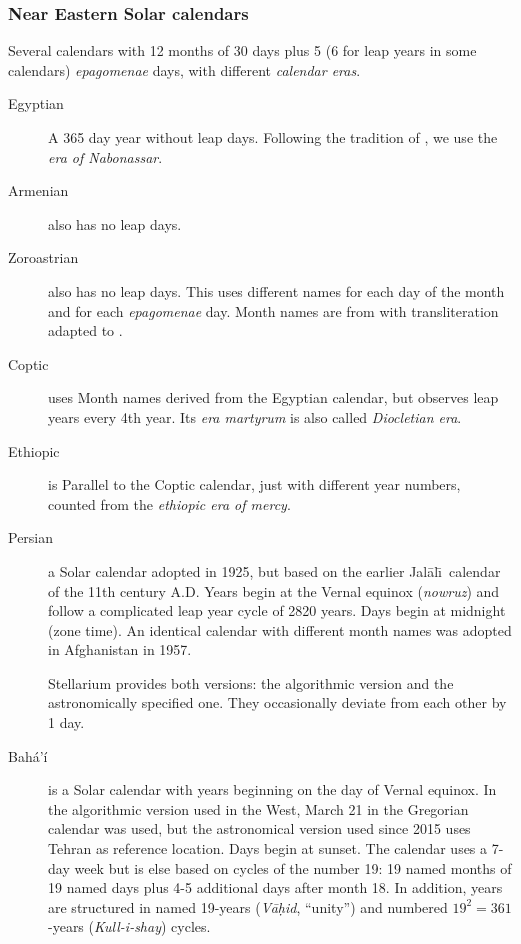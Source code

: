 \subsubsection{Near Eastern Solar calendars}
Several calendars with 12 months of 30 days plus 5 (6 for leap years
in some calendars) \emph{epagomenae} days, with different \emph{calendar eras}.
\begin{description}
\item[Egyptian] A 365 day year without leap days. Following the
  tradition of , we use the \emph{era of Nabonassar}.
\item[Armenian] also has no leap days.
\item[Zoroastrian] also has no leap days. This uses different names
  for each day of the month and for each \emph{epagomenae} day. Month
  names are from \citet[\S69]{Ginzel:ChronologieI} with
  transliteration adapted to \citet{Reingold-Dershowitz:2018}.
\item[Coptic] uses Month names derived from the Egyptian calendar, but observes
  leap years every 4th year. Its \emph{era martyrum} is also called
  \emph{Diocletian era}.
\item[Ethiopic] is Parallel to the Coptic calendar, just with different
  year numbers, counted from the \emph{ethiopic era of mercy}.
\item[Persian] a Solar calendar adopted in 1925,
  but based on the earlier Jal\=al\=\i\ calendar of the 11th century
  A.D. Years begin at the Vernal equinox (\emph{nowruz}) and follow a
  complicated leap year cycle of 2820 years. Days begin at midnight
  (zone time). An identical calendar with different month names was
  adopted in Afghanistan in 1957.

  Stellarium provides both versions: the algorithmic version and the
  astronomically specified one. They occasionally deviate from each
  other by 1 day.
\item[Bahá’í] is a Solar calendar with years beginning on the day of
  Vernal equinox.  In the algorithmic version used in
  the West, March 21 in the Gregorian calendar was used, but the
  astronomical version used since 2015 uses Tehran as reference
  location.  Days begin at sunset. The calendar uses a 7-day week but
  is else based on cycles of the number 19: 19 named months of 19
  named days plus 4-5 additional days after month 18. In addition,
  years are structured in named 19-years (\emph{Vāḥid}, ``unity'') and
  numbered $19^2=361$-years (\emph{Kull-i-shay}) cycles.
\end{description}

